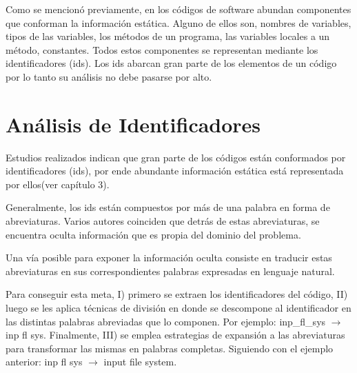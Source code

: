 \documentclass[a4paper,12pt]{report}
\begin{document}
Como se mencionó previamente, en los códigos de software abundan componentes que conforman la información estática. Alguno de ellos son, nombres de variables, tipos de las variables, los métodos de un programa, las variables locales a un método, constantes. Todos estos componentes se representan mediante los identificadores (ids). Los ids abarcan gran parte de los elementos de un código por lo tanto su análisis no debe pasarse por alto. 



\section{Análisis de Identificadores}

Estudios realizados\cite{DFPM05} indican que gran parte de los códigos están conformados por identificadores (ids), por ende abundante información estática está representada por ellos(ver capítulo 3).

Generalmente, los ids están compuestos por más de una palabra en forma de abreviaturas. Varios autores coinciden\cite{BCPT99,LFBEX07,EZH08,EHPV09} que detrás de estas abreviaturas, se encuentra oculta información que es propia del dominio del problema.


Una vía posible para exponer la información oculta consiste en traducir estas abreviaturas en sus correspondientes palabras expresadas en lenguaje natural.

Para conseguir esta meta, I) primero se extraen los identificadores del código, II) luego se les aplica técnicas de división en donde se descompone al identificador en las distintas palabras abreviadas que lo componen. Por ejemplo: \textsf{inp\_fl\_sys} $\rightarrow$ \textsf{inp fl sys}. Finalmente, III) se emplea estrategias de expansión a las abreviaturas para transformar las mismas en palabras completas. Siguiendo con el ejemplo anterior: \textsf{inp fl sys} $\rightarrow$ \textsf{input file system}.

\end{document}
